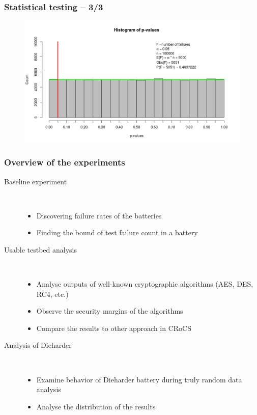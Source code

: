 \documentclass[aspectratio=169]{beamer}
\begin{document}
\begin{frame}
\frametitle{Statistical testing -- 3/3}

\begin{figure}
\begin{nomar}
\centering
\includegraphics[width=.8\paperwidth]{figures/single-fails-4.png} 
\end{nomar}
\end{figure}

\end{frame}

\begin{frame}
\frametitle{Overview of the experiments}

\begin{description}
\item[Baseline experiment] \hfill \\
\begin{itemize}
\item Discovering failure rates of the batteries
\item Finding the bound of test failure count in a battery
\end{itemize}
\vspace{.2cm}
\item[Usable testbed analysis] \hfill \\
\begin{itemize}
\item Analyse outputs of well-known cryptographic algorithms (AES, DES, RC4, etc.)
\item Observe the security margins of the algorithms
\item Compare the results to other approach in CRoCS
\end{itemize}
\vspace{.2cm}
\item[Analysis of Dieharder] \hfill \\
\begin{itemize}
\item Examine behavior of Dieharder battery during truly random data analysis
\item Analyse the distribution of the results
\end{itemize}
\end{description}

\end{frame}
\end{document}
